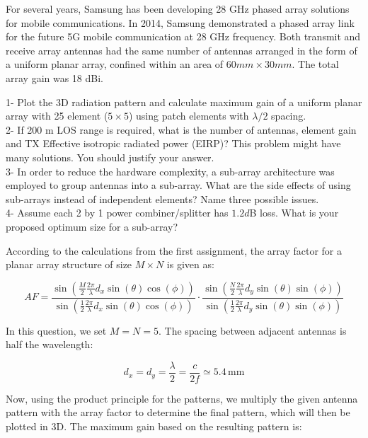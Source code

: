 \documentclass[12pt,onecolumn,a4paper]{article}
\begin{document}
{\color{questioncolor}
For several years, Samsung has been developing 28 GHz phased array solutions for mobile communications. In 2014, Samsung demonstrated a phased array link for the future 5G mobile communication at 28 GHz frequency. Both transmit and receive array antennas had the same number of antennas arranged in the form of a uniform planar array, confined within an area of $60 mm
\times 30 mm$. The total array gain was 18 dBi.\\
}




{\color{questioncolor}

1- Plot the 3D radiation pattern and calculate maximum gain of a uniform planar array with 25 element ($5\times 5$) using patch elements with $\lambda/2$ spacing. \\

2- If 200 m LOS range is required, what is the number of antennas, element gain and TX Effective isotropic radiated power (EIRP)? This problem might have many solutions. You should justify your answer.\\

3- In order to reduce the hardware complexity, a sub-array architecture was employed to group antennas into a sub-array. What are the side effects of using sub-arrays instead of independent elements? Name three possible issues.\\

4- Assume each 2 by 1 power combiner/splitter has $1.2 d$B loss. What is your proposed optimum size for a sub-array?\\

}



According to the calculations from the first assignment, the array factor for a planar array structure of size \(M \times N\) is given as:

\[
AF = \frac{\sin\left(\frac{M}{2} \frac{2\pi}{\lambda} d_x \sin(\theta) \cos(\phi)\right)}{\sin\left(\frac{1}{2} \frac{2\pi}{\lambda} d_x \sin(\theta) \cos(\phi)\right)}
\cdot 
\frac{\sin\left(\frac{N}{2} \frac{2\pi}{\lambda} d_y \sin(\theta) \sin(\phi)\right)}{\sin\left(\frac{1}{2} \frac{2\pi}{\lambda} d_y \sin(\theta) \sin(\phi)\right)} 
\]

In this question, we set \(M = N = 5\). The spacing between adjacent antennas is half the wavelength:

\[
d_x = d_y = \frac{\lambda}{2} = \frac{c}{2f} \simeq 5.4 \, \text{mm}
\]

Now, using the product principle for the patterns, we multiply the given antenna pattern with the array factor to determine the final pattern, which will then be plotted in 3D. The maximum gain based on the resulting pattern is:
\end{document}
